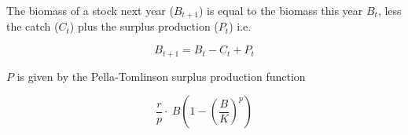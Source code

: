 The biomass of a stock next year ($B_{t+1}$) is equal to the biomass this year $B_{t}$, less the catch ($C_t$) plus the surplus production ($P_t$) i.e. 

\begin{equation}  B_{t+1}=B_{t}-C_{t}+P_{t}\end{equation}  

$P$ is given by the Pella-Tomlinson surplus production function \citep{pella1969generalized}

\begin{equation}\frac{r}{p}\cdot~B(1-(\frac{B}{K})^p)\end{equation}  

